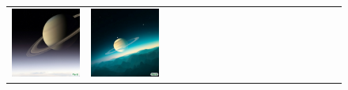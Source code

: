 \begin{figure}[ht!]
\begin{adjustwidth}{-0.8in}{-0.5in}
\begin{tabular}{cccccccccccccccccccc}
\multicolumn{2}{c}{\includegraphics[width=\threebythreecolwidth\textwidth]{figures/cherries/saturn1.jpg}} &
\multicolumn{2}{c}{\includegraphics[width=\threebythreecolwidth\textwidth]{figures/cherries/saturn2.jpg}} &

\end{tabular}
\end{adjustwidth}
\end{figure}
